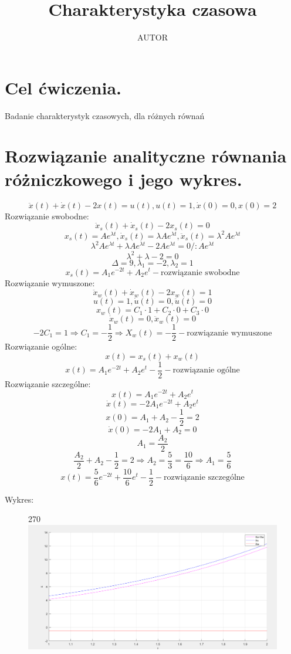 \documentclass{article}
\title{Charakterystyka czasowa}
\author{AUTOR}
\date{}
\begin{document}
\maketitle
\section{Cel ćwiczenia.}
Badanie charakterystyk czasowych, dla różnych równań
\section{Rozwiązanie analityczne równania różniczkowego i jego wykres.}
$$
\ddot{x}(t)+\dot{x}(t)-2x(t)=u(t), u(t)=1, \dot{x}(0)=0, x(0)=2
$$
Rozwiązanie swobodne:
$$
\ddot{x}_s(t)+\dot{x}_s(t)-2x_s(t)=0
$$
$$
x_s(t)=Ae^{\lambda t}, \dot{x}_s(t)=\lambda Ae^{\lambda t}, \ddot{x}_s(t)=\lambda^2 Ae^{\lambda t}
$$
$$
\lambda^2 Ae^{\lambda t}+\lambda Ae^{\lambda t}-2Ae^{\lambda t}=
0/:Ae^{\lambda t}
$$
$$
\lambda^2+\lambda-2=0
$$
$$
\Delta=9, \lambda_1=-2, \lambda_2=1
$$
$$
x_s(t)=A_1e^{-2t}+A_2e^{t} - \text{rozwiązanie swobodne}
$$
Rozwiązanie wymuszone:
$$
\ddot{x}_w(t)+\dot{x}_w(t)-2x_w(t)=1
$$
$$
u(t)=1,\dot{u}(t)=0 ,\ddot{u}(t)=0
$$
$$
x_w(t)=C_1\cdot1+C_2\cdot0+C_3\cdot0
$$
$$
\dot{x}_w(t)=0,\ddot{x}_w(t)=0
$$
$$
-2C_1=1 \Rightarrow C_1=-\frac{1}{2} \Rightarrow X_w(t)=-\frac{1}{2} - \text{rozwiązanie wymuszone}
$$
Rozwiązanie ogólne: 
$$
x(t)=x_s(t)+x_w(t)
$$
$$
x(t)=A_1e^{-2t}+A_2e^{t}-\frac{1}{2}-\text{rozwiązanie ogólne}
$$
Rozwiązanie szczególne:
$$
x(t)=A_1e^{-2t}+A_2e^{t}
$$
$$
\dot{x}(t)=-2A_1e^{-2t}+A_2e^{t}
$$
$$
x(0)=A_1+A_2-\frac{1}{2}=2
$$
$$
\dot{x}(0)=-2A_1+A_2=0
$$
$$
A_1=\frac{A_2}{2}
$$
$$
\frac{A_2}{2}+A_2-\frac{1}{2}=2 \Rightarrow A_2=\frac{5}{3}=\frac{10}{6}
\Rightarrow A_1=\frac{5}{6}
$$
$$
x(t)=\frac{5}{6}e^{-2t}+\frac{10}{6}e^{t}-\frac{1}{2}-\text{rozwiązanie szczególne}
$$



\newpage
Wykres:
\begin{figure}[h!]
    \centering
     \begin{turn}{270}
    \includegraphics[width=1.3\textwidth]{rozwiazanie_analityczne_wykres.png}
    \end{turn}
    \label{fig:my_label}
\end{figure}
\end{document}
